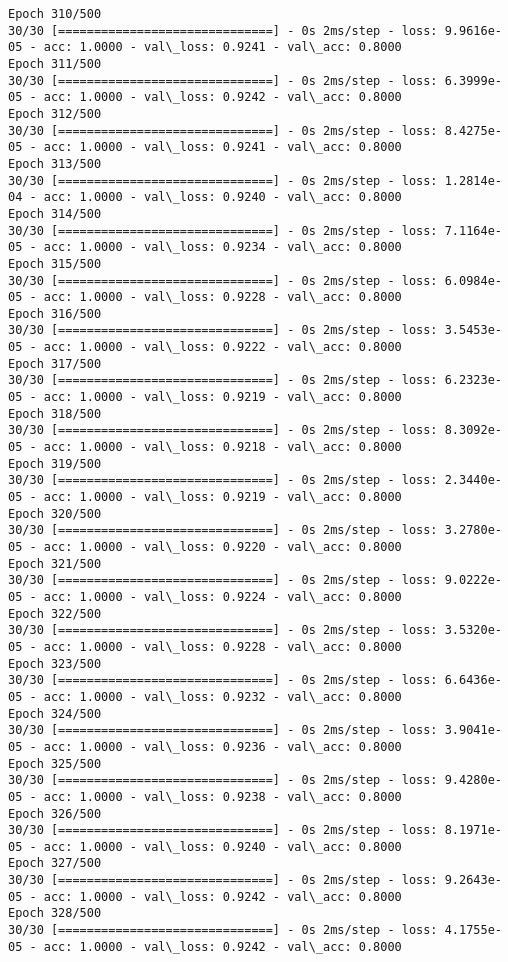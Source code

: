 \documentclass[11pt]{article}
\begin{document}
\begin{Verbatim}[commandchars=\\\{\}]
Epoch 310/500
30/30 [==============================] - 0s 2ms/step - loss: 9.9616e-05 - acc: 1.0000 - val\_loss: 0.9241 - val\_acc: 0.8000
Epoch 311/500
30/30 [==============================] - 0s 2ms/step - loss: 6.3999e-05 - acc: 1.0000 - val\_loss: 0.9242 - val\_acc: 0.8000
Epoch 312/500
30/30 [==============================] - 0s 2ms/step - loss: 8.4275e-05 - acc: 1.0000 - val\_loss: 0.9241 - val\_acc: 0.8000
Epoch 313/500
30/30 [==============================] - 0s 2ms/step - loss: 1.2814e-04 - acc: 1.0000 - val\_loss: 0.9240 - val\_acc: 0.8000
Epoch 314/500
30/30 [==============================] - 0s 2ms/step - loss: 7.1164e-05 - acc: 1.0000 - val\_loss: 0.9234 - val\_acc: 0.8000
Epoch 315/500
30/30 [==============================] - 0s 2ms/step - loss: 6.0984e-05 - acc: 1.0000 - val\_loss: 0.9228 - val\_acc: 0.8000
Epoch 316/500
30/30 [==============================] - 0s 2ms/step - loss: 3.5453e-05 - acc: 1.0000 - val\_loss: 0.9222 - val\_acc: 0.8000
Epoch 317/500
30/30 [==============================] - 0s 2ms/step - loss: 6.2323e-05 - acc: 1.0000 - val\_loss: 0.9219 - val\_acc: 0.8000
Epoch 318/500
30/30 [==============================] - 0s 2ms/step - loss: 8.3092e-05 - acc: 1.0000 - val\_loss: 0.9218 - val\_acc: 0.8000
Epoch 319/500
30/30 [==============================] - 0s 2ms/step - loss: 2.3440e-05 - acc: 1.0000 - val\_loss: 0.9219 - val\_acc: 0.8000
Epoch 320/500
30/30 [==============================] - 0s 2ms/step - loss: 3.2780e-05 - acc: 1.0000 - val\_loss: 0.9220 - val\_acc: 0.8000
Epoch 321/500
30/30 [==============================] - 0s 2ms/step - loss: 9.0222e-05 - acc: 1.0000 - val\_loss: 0.9224 - val\_acc: 0.8000
Epoch 322/500
30/30 [==============================] - 0s 2ms/step - loss: 3.5320e-05 - acc: 1.0000 - val\_loss: 0.9228 - val\_acc: 0.8000
Epoch 323/500
30/30 [==============================] - 0s 2ms/step - loss: 6.6436e-05 - acc: 1.0000 - val\_loss: 0.9232 - val\_acc: 0.8000
Epoch 324/500
30/30 [==============================] - 0s 2ms/step - loss: 3.9041e-05 - acc: 1.0000 - val\_loss: 0.9236 - val\_acc: 0.8000
Epoch 325/500
30/30 [==============================] - 0s 2ms/step - loss: 9.4280e-05 - acc: 1.0000 - val\_loss: 0.9238 - val\_acc: 0.8000
Epoch 326/500
30/30 [==============================] - 0s 2ms/step - loss: 8.1971e-05 - acc: 1.0000 - val\_loss: 0.9240 - val\_acc: 0.8000
Epoch 327/500
30/30 [==============================] - 0s 2ms/step - loss: 9.2643e-05 - acc: 1.0000 - val\_loss: 0.9242 - val\_acc: 0.8000
Epoch 328/500
30/30 [==============================] - 0s 2ms/step - loss: 4.1755e-05 - acc: 1.0000 - val\_loss: 0.9242 - val\_acc: 0.8000

\end{Verbatim}
\end{document}
